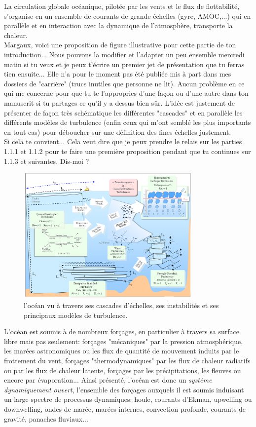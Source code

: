 La circulation globale océanique, pilotée par les vents et le flux de flottabilité, s'organise en un ensemble de courants de grande échelles (gyre, AMOC,...) qui en parallèle et en interaction avec la dynamique de l'atmosphère, transporte la chaleur. \\
\color{red}
Margaux, voici une proposition de figure illustrative pour cette partie de ton introduction... Nous pouvons la modifier et l'adapter un peu ensemble mercredi matin si tu veux et je peux t'écrire un premier jet de présentation que tu ferras tien ensuite... Elle n'a pour le moment pas été publiée mis à part dans mes dossiers de "carrière" (trucs inutiles que personne ne lit). Aucun problème en ce qui me concerne pour que tu te l'appropries d'une façon ou d'une autre dans ton manuscrit si tu partages ce qu'il y a dessus bien sûr. L'idée est justement de présenter de façon très schématique les différentes "cascades" et en parallèle les différents modèles de turbulence (enfin ceux qui m'ont semblé les plus importants en tout cas) pour déboucher sur une définition des fines échelles justement. \\
Si cela te convient... Cela veut dire que je peux prendre le relais sur les parties 1.1.1 et 1.1.2 pour te faire une première proposition pendant que tu continues sur 1.1.3 et suivantes. Dis-moi ?\\
\begin{figure}[!h]
  \centering
  \includegraphics[width=0.8\textwidth]{./INTRO/Ocean_scales.png}
  \caption{\color{red}l'océan vu à travers ses cascades d'échelles, ses instabilités et ses principaux modèles de turbulence.\color{black}}
  \label{fig_ocean_scales}
\end{figure}
\color{blue}
L'océan est soumis à de nombreux forçages, en particulier à travers sa surface libre mais pas seulement: forçages "mécaniques" par la pression atmosphérique, les marées astronomiques ou les flux de quantité de mouvement induits par le frottement du vent, forçages "thermodynamiques" par les flux de chaleur radiatifs ou par les flux de chaleur latente, forçages par les précipitations, les fleuves ou encore par évaporation... Ainsi présenté, l'océan est donc un \textit{système dynamiquement ouvert}, l'ensemble des forçages auxquels il est soumis induisant un large spectre de processus dynamiques: houle, courants d'Ekman, upwelling ou downwelling, ondes de marée, marées internes, convection profonde, courants de gravité, panaches fluviaux... \\
